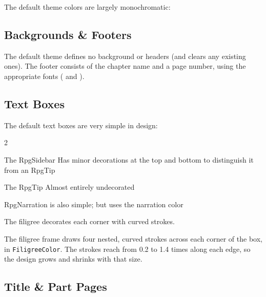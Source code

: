 			The default theme colors are largely monochromatic:

			\DefaultSwatches{}

		\subsection{Backgrounds \& Footers}
			The default theme defines no background or headers (and clears any existing ones). The footer consists of the chapter name and a page number, using the appropriate fonts ( and ).


		\subsection{Text Boxes}

			The default text boxes are very simple in design:

			\begin{multicols}{2}

				\begin{RpgSidebar}{The RpgSidebar}
					Has minor decorations at the top and bottom to distinguish it from an RpgTip
				\end{RpgSidebar}

				\begin{RpgTip}{The RpgTip}
					Almost entirely undecorated
				\end{RpgTip}

				\begin{RpgNarration}
					RpgNarration is also simple; but uses the narration color
				\end{RpgNarration}
				\vfil
				\begin{RpgFiligree}
					The filigree decorates each corner with curved strokes.
				\end{RpgFiligree}
			\end{multicols}

			The filigree frame  draws four nested, curved strokes across each corner of the box, in \texttt{FiligreeColor}. The strokes reach from 0.2 to 1.4 times  along each edge, so the design grows and shrinks with that size.




		\subsection{Title \& Part Pages}\label{S:DefaultTitles}

